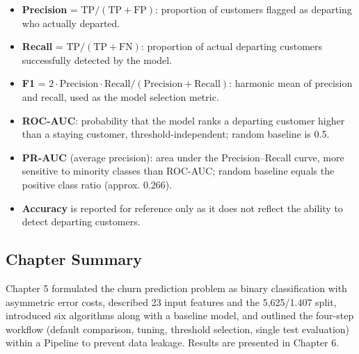 \begin{itemize}
    \item \textbf{Precision} = $\text{TP} / (\text{TP} + \text{FP})$: proportion of customers flagged as departing who actually departed.
    \item \textbf{Recall} = $\text{TP} / (\text{TP} + \text{FN})$: proportion of actual departing customers successfully detected by the model.
    \item \textbf{F1} = $2 \cdot \text{Precision} \cdot \text{Recall} / (\text{Precision} + \text{Recall})$: harmonic mean of precision and recall, used as the model selection metric.
    \item \textbf{ROC-AUC}: probability that the model ranks a departing customer higher than a staying customer, threshold-independent; random baseline is 0.5.
    \item \textbf{PR-AUC} (average precision): area under the Precision–Recall curve, more sensitive to minority classes than ROC-AUC; random baseline equals the positive class ratio (approx. 0.266).
    \item \textbf{Accuracy} is reported for reference only as it does not reflect the ability to detect departing customers.
\end{itemize}

\subsection{ Chapter Summary}

Chapter 5 formulated the churn prediction problem as binary classification with asymmetric error costs, described 23 input features and the 5,625/1.407 split, introduced six algorithms along with a baseline model, and outlined the four-step workflow (default comparison, tuning, threshold selection, single test evaluation) within a Pipeline to prevent data leakage. Results are presented in Chapter 6.